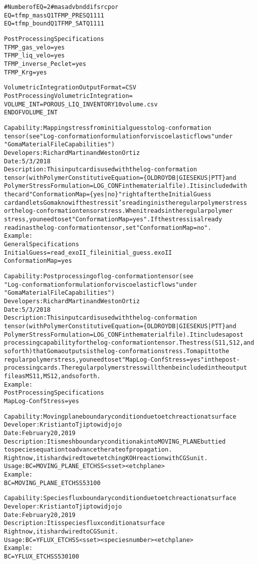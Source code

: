 \documentclass{article}
\begin{document}
\begin{alltt}
#Number of EQ = 2                # mas adv bnd dif src por
EQ = tfmp_mass  Q1  TFMP_PRES  Q1   1   1       1
EQ = tfmp_bound Q1  TFMP_SAT   Q1   1   1           1

Post Processing Specifications
TFMP_gas_velo = yes
TFMP_liq_velo = yes
TFMP_inverse_Peclet = yes
TFMP_Krg = yes

Volumetric Integration Output Format = CSV
Post Processing Volumetric Integration = 
VOLUME_INT = POROUS_LIQ_INVENTORY 1 0 volume.csv
END OF VOLUME_INT

Capability:  Mapping stress from initial guess to log-conformation
tensor (see "Log-conformation formulation for viscoelastic flows" under
"Goma Material File Capabilities")
Developers: Richard Martin and Weston Ortiz
Date: 5/3/2018
Description:  This input card is used with the log-conformation
tensor (with Polymer Constitutive Equation = \{OLDROYDB | GIESEKUS | PTT\} and
Polymer Stress Formulation = LOG_CONF in the material file). It is included with
the card "Conformation Map = \{yes|no\}" right after the Initial Guess
card and lets Goma know if the stress it's reading in is the regular polymer stress
or the log-conformation tensor stress. When it reads in the regular polymer
stress, you need to set "Conformation Map = yes". If the stress is already
read in as the log-conformation tensor, set "Conformation Map = no".
Example:
General Specifications
Initial Guess = read_exoII_file initial_guess.exoII
Conformation Map = yes

Capability:  Post processing of log-conformation tensor (see
"Log-conformation formulation for viscoelastic flows" under
"Goma Material File Capabilities")
Developers: Richard Martin and Weston Ortiz
Date: 5/3/2018
Description:  This input card is used with the log-conformation
tensor (with Polymer Constitutive Equation = \{OLDROYDB | GIESEKUS | PTT\} and
Polymer Stress Formulation = LOG_CONF in the material file). It includes a post
processing capability for the log-conformation tensor. The stress (S11, S12, and
so forth) that Goma outputs is the log-conformation stress. To map it to the
regular polymer stress, you need to set "Map Log-Conf Stress = yes" in the post-
processing cards. The regular polymer stress will then be included in the output
file as MS11, MS12, and so forth.
Example:
Post Processing Specifications
Map Log-Conf Stress = yes

Capability: Moving plane boundary condition due to etch reaction at surface
Developer: Kristianto Tjiptowidjojo
Date: February 20, 2019
Description: It is mesh boundary condition akin to MOVING_PLANE but tied
             to species equation to advance the rate of propagation.
             Right now, it is hardwired to wet etching KOH reaction with CGS unit.
Usage: BC = MOVING_PLANE_ETCH SS <sset> <etch plane>
Example:
        BC = MOVING_PLANE_ETCH SS 53 100

Capability: Species flux boundary condition due to etch reaction at surface
Developer: Kristianto Tjiptowidjojo
Date: February 20, 2019
Description: It is species flux condition at surface
             Right now, it is hardwired to CGS unit.
Usage: BC = YFLUX_ETCH SS <sset> <species number> <etch plane>
Example:
        BC = YFLUX_ETCH SS 53 0 100

\end{alltt}
\end{document}
